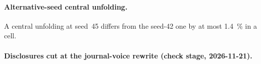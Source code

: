 \paragraph{Alternative-seed central unfolding.} A central unfolding at seed~45 differs from the seed-42 one by at most \SI{1.4}{\percent} in a cell.

\paragraph{Disclosures cut at the journal-voice rewrite (check stage, 2026-11-21).}

